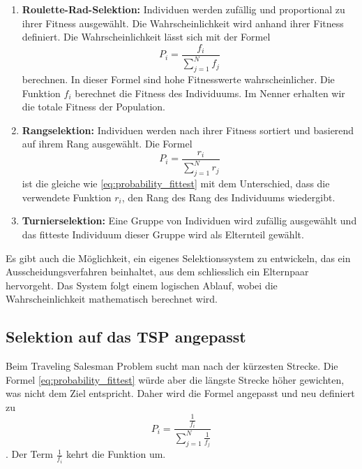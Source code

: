 \begin{enumerate}
    \item \textbf{Roulette-Rad-Selektion:} Individuen werden zufällig und
    proportional zu ihrer Fitness ausgewählt. Die Wahrscheinlichkeit wird 
    anhand ihrer Fitness definiert. Die Wahrscheinlichkeit lässt sich mit der Formel
    \begin{equation}
        P_i
        =
        \frac{f_i}{\sum_{j=1}^{N} f_j}
        \label{eq:probability_fittest}
    \end{equation}
    berechnen. In dieser Formel sind hohe Fitnesswerte wahrscheinlicher. Die Funktion \(f_i\) 
    berechnet die Fitness des Individuums. Im Nenner erhalten wir die totale Fitness der Population.
    \item \textbf{Rangselektion:} Individuen werden nach ihrer Fitness sortiert und basierend
    auf ihrem Rang ausgewählt. Die Formel 
    \begin{equation}
        P_i
        =
        \frac{r_i}{\sum_{j=1}^{N} r_j}
        \label{eq:probability_rating}
    \end{equation}
    ist die gleiche wie \eqref{eq:probability_fittest} mit dem Unterschied, dass die verwendete Funktion 
    \(r_i\), den Rang des Rang des Individuums wiedergibt.
    \item \textbf{Turnierselektion:} Eine Gruppe von Individuen wird zufällig ausgewählt
    und das fitteste Individuum dieser Gruppe wird als Elternteil gewählt.
\end{enumerate}
Es gibt auch die Möglichkeit, ein eigenes Selektionssystem zu entwickeln, 
das ein Ausscheidungsverfahren beinhaltet, aus dem schliesslich ein 
Elternpaar hervorgeht. Das System folgt einem logischen Ablauf, wobei 
die Wahrscheinlichkeit mathematisch berechnet wird.

\subsection{Selektion auf das TSP angepasst
\label{buch:paper:varalg:subsection:selection_tsp}}
Beim Traveling Salesman Problem sucht man nach der kürzesten Strecke. Die Formel 
\eqref{eq:probability_fittest} würde aber die längste Strecke höher gewichten, was
nicht dem Ziel entspricht. Daher wird die Formel angepasst und neu definiert zu
\begin{equation}
    P_i
    =
    \frac{\frac{1}{f_i}}{\sum_{j=1}^{N} \frac{1}{f_j}}
    \label{eq:probability_fittest_tsp}
\end{equation}
. Der Term \(\frac{1}{f_i}\) kehrt die Funktion um.

